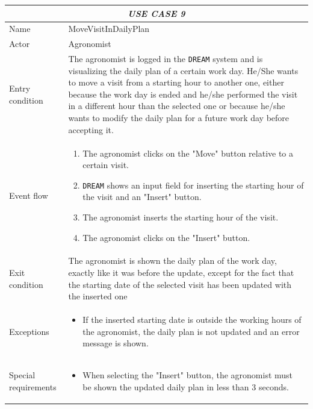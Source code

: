 \documentclass{article}
\begin{document}
\centering
\begin{longtable}{|p{3.5cm}|m{8cm}|}
 \hline
 \multicolumn{2}{|c|}{\cellcolor{white}\emph{USE CASE 9}} \\
 \endfirsthead
 \endhead
 \endfoot
 \endlastfoot
 \hline
 Name & MoveVisitInDailyPlan\\
 \hline
 Actor & Agronomist\\
 \hline
 Entry condition & The agronomist is logged in the \verb|DREAM| system and is visualizing the daily plan of a certain work day. He/She wants to move a visit from a starting hour to another one, either because the work day is ended and he/she performed the visit in a different hour than the selected one or because he/she wants to modify the daily plan for a future work day before accepting it.\\
 \hline
 Event flow & \begin{enumerate}
    \item The agronomist clicks on the "Move" button relative to a certain visit.
    \item \verb|DREAM| shows an input field for inserting the starting hour of the visit and an "Insert" button.
    \item The agronomist inserts the starting hour of the visit.
    \item The agronomist clicks on the "Insert" button.
 \end{enumerate}\\
 \hline
 Exit condition & The agronomist is shown the daily plan of the work day, exactly like it was before the update, except for the fact that the starting date of the selected visit has been updated with the inserted one\\
 \hline
 Exceptions & \begin{itemize}
     \item If the inserted starting date is outside the working hours of the agronomist, the daily plan is not updated and an error message is shown.
 \end{itemize}\\
 \hline
 Special requirements &\begin{itemize}
     \item When selecting the "Insert" button, the agronomist must be shown the updated daily plan in less than 3 seconds.
 \end{itemize}\\
 \hline
\end{longtable}
\end{document}
